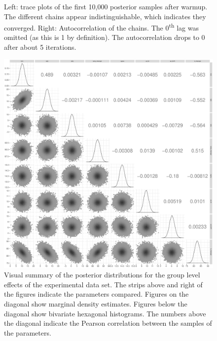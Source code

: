 \documentclass[a4paper]{article}
\begin{document}
\begin{figure}[!ht]
\begin{subfigure}{.5\textwidth}
	\end{subfigure}%
	\caption{Left: trace plots of the first 10,000 posterior samples after warmup. The different chains appear indistinguishable, which indicates they converged. Right: Autocorrelation of the chains. The 0\textsuperscript{th} lag was omitted (as this is 1 by definition). The autocorrelation drops to 0 after about 5 iterations.}
	\label{fig:baselinePosteriorDiagnostics}
\end{figure}



\begin{figure}[!ht]
	\includegraphics[width=\textwidth]{figures/productPosteriorDescriptivesPlot.pdf}
	\caption{Visual summary of the posterior distributions for the group level effects of the experimental data set. The strips above and right of the figures indicate the parameters compared. Figures on the diagonal show marginal density estimates. Figures below the diagonal show bivariate hexagonal histograms. The numbers above the diagonal indicate the Pearson correlation between the samples of the parameters.}
	\label{fig:productPosteriorDescriptives}
\end{figure}
\end{document}

